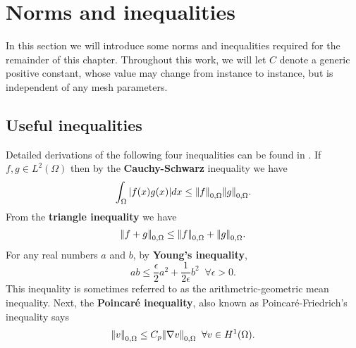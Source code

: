 \section{Norms and inequalities}
\label{sec:norms_inequalities}
In this section we will introduce some norms and inequalities required for the remainder of this chapter. Throughout this work, we will let $C$ denote a generic positive constant, whose value may change from instance to instance, but is independent of any mesh parameters.
\subsection{Useful inequalities}
Detailed derivations of the following four inequalities can be found in \citet{brenner2008mathematical}. If $f,g \in L^{2}(\Omega)$ then by the \textbf{Cauchy-Schwarz} inequality  we have 
\begin{equation*}
 \int_{\Omega}|f(x)g(x)|dx \leq {\left\vert\kern-0.25ex\left\vert f \right\vert\kern-0.25ex\right\vert}_{0,\Omega}{\left\vert\kern-0.25ex\left\vert g \right\vert\kern-0.25ex\right\vert}_{0,\Omega}.
\label{cs}
\end{equation*}
%
From the \textbf{triangle inequality} we have
\begin{equation*}
{\left\vert\kern-0.25ex\left\vert f + g \right\vert\kern-0.25ex\right\vert}_{0,\Omega}\leq {\left\vert\kern-0.25ex\left\vert f \right\vert\kern-0.25ex\right\vert}_{0,\Omega} + {\left\vert\kern-0.25ex\left\vert g \right\vert\kern-0.25ex\right\vert}_{0,\Omega}.
\end{equation*}
%
For any real numbers $a$ and $b$, by \textbf{Young's inequality},
\begin{equation*}
 ab \leq \frac{\epsilon}{2} a^{2} + \frac{1}{2\epsilon}b^{2} \;\;\forall \epsilon > 0.
\end{equation*}
This inequality is sometimes referred to as the arithmetric-geometric mean inequality.
%
Next, the \textbf{Poincar\'{e} inequality}, also known as Poincar\'{e}-Friedrich's inequality says
\begin{equation*}
{\left\vert\kern-0.25ex\left\vert v \right\vert\kern-0.25ex\right\vert}_{0,\Omega}\leq C_{p} {\left\vert\kern-0.25ex\left\vert \nabla v \right\vert\kern-0.25ex\right\vert}_{0,\Omega} \;\; \forall v \in H^{1}(\Omega).
\end{equation*}
%


